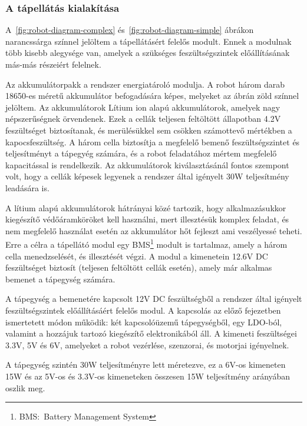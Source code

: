 \subsubsection{A tápellátás kialakítása}
A~\ref{fig:robot-diagram-complex} és~\ref{fig:robot-diagram-simple} ábrákon
narancssárga színnel jelöltem a tápellátásért felelős modult. Ennek a modulnak
több kisebb alegysége van, amelyek a szükséges feszültségszintek előállításának
más-más részeiért felelnek.

\medskip

Az akkumulátorpakk a rendszer energiatároló modulja. A robot három darab 18650-es
méretű akkumulátor befogadására képes, melyeket az ábrán zöld színnel
jelöltem. Az akkumulátorok Lítium ion alapú akkumulátorok, amelyek nagy
népszerűségnek örvendenek. Ezek a cellák teljesen feltöltött állapotban 4.2V
feszültséget biztosítanak, és merülésükkel sem csökken számottevő mértékben a
kapocsfeszültség. A három cella biztosítja a megfelelő bemenő feszültségszintet
és teljesítményt a tápegyég számára, és a robot feladatához mértem megfelelő
kapacitással is rendelkezik. Az akkumulátorok kiválasztásánál fontos szempont
volt, hogy a cellák képesek legyenek a rendszer által igényelt 30W teljesítmény
leadására is.

\medskip

A lítium alapú akkumulátorok hátrányai közé tartozik, hogy alkalmazásukkor
kiegészítő védőáramköröket kell használni, mert illesztésük komplex feladat, és
nem megfelelő használat esetén az akkumulátor hőt fejleszt ami veszélyessé
teheti. Erre a célra a tápellátó modul egy BMS\footnote{BMS:~Battery Management
System} modult is tartalmaz, amely a három cella menedzselését, és illesztését
végzi. A modul a kimenetein 12.6V DC feszültséget biztosít (teljesen feltöltött
cellák esetén), amely már alkalmas bemenet a tápegység számára.

\medskip

A tápegység a bemenetére kapcsolt 12V DC feszültségből a rendszer által igényelt
feszültségszintek előállításáért felelős modul. A kapcsolás az előző fejezetben
ismertetett módon működik: két kapcsolóüzemű tápegységből, egy LDO-ból, valamint
a hozzájuk tartozó kiegészítő elektronikából áll. A kimeneti feszültségei 3.3V,
5V és 6V, amelyeket a robot vezérlése, szenzorai, és motorjai igényelnek.

A tápegység szintén 30W teljesítményre lett méretezve, ez a 6V-os kimeneten 15W
és az 5V-os és 3.3V-os kimeneteken összesen 15W teljesítmény arányában oszlik
meg. 

